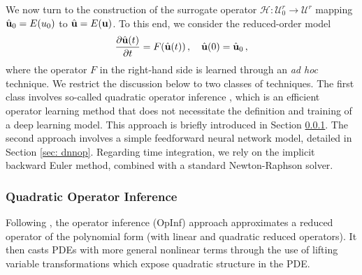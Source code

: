 We now turn to the construction of the surrogate operator $\mathcal{H}: \mathcal{U}_0^r \to \mathcal{U}^r$ mapping $\hat{\textbf{u}}_0 = E(u_0)$ to $\hat{\textbf{u}} = E(\textbf{u})$. To this end, we consider the reduced-order model
\begin{equation}
    \frac{\partial \hat{\textbf{u}}(t)}{\partial t} = F(\hat{\textbf{u}}(t))\,, \quad \hat{\textbf{u}}(0) = \hat{\textbf{u}}_0\,,
\end{equation}
where the operator $F$ in the right-hand side is learned through an \textit{ad hoc} technique. We restrict the discussion below to two classes of techniques. The first class involves so-called quadratic operator inference \cite{qian2022reduced}, which is an efficient operator learning method that does not necessitate the definition and training of a deep learning model. This approach is briefly introduced in Section \ref{sec: opinf}. The second approach involves a simple feedforward neural network model, detailed in Section \ref{sec: dnnop}. Regarding time integration, we rely on the implicit backward Euler method, combined with a standard Newton-Raphson solver. 

\subsubsection{Quadratic Operator Inference}\label{sec: opinf}
Following \cite{qian2022reduced}, the operator inference (OpInf) approach approximates a reduced operator of the polynomial form (with linear and quadratic reduced operators). It then casts PDEs with more general nonlinear terms through the use of lifting variable transformations which expose quadratic structure in the PDE.

